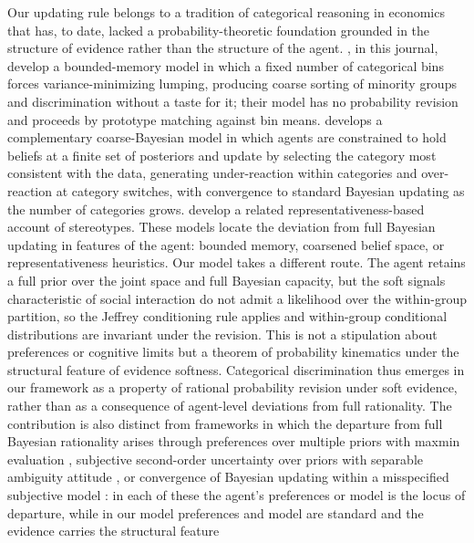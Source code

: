 \documentclass[12pt,a4paper]{article}
\theoremstyle{definition}
\numberwithin{proposition}{subsection}
\begin{document}
Our updating rule belongs to a tradition of categorical reasoning in
economics that has, to date, lacked a probability-theoretic foundation
grounded in the structure of evidence rather than the structure of the
agent. \citet{FryerJackson2008}, in this journal, develop a
bounded-memory model in which a fixed number of categorical bins forces
variance-minimizing lumping, producing coarse sorting of minority
groups and discrimination without a taste for it; their model has no
probability revision and proceeds by prototype matching against bin
means. \citet{Mullainathan2002} develops a complementary
coarse-Bayesian model in which agents are constrained to hold beliefs
at a finite set of posteriors and update by selecting the category
most consistent with the data, generating under-reaction within
categories and over-reaction at category switches, with convergence to
standard Bayesian updating as the number of categories grows.
\citet{BordaloEtal2016} develop a related representativeness-based
account of stereotypes. These models locate the deviation from full
Bayesian updating in features of the agent: bounded memory, coarsened
belief space, or representativeness heuristics. Our model takes a
different route. The agent retains a full prior over the joint space
and full Bayesian capacity, but the soft signals characteristic of
social interaction do not admit a likelihood over the within-group
partition, so the Jeffrey conditioning rule applies and within-group
conditional distributions are invariant under the revision. This is
not a stipulation about preferences or cognitive limits but a theorem
of probability kinematics \citep{Jeffrey1965,Jeffrey2004} under the
structural feature of evidence softness. Categorical discrimination
thus emerges in our framework as a property of rational probability
revision under soft evidence, rather than as a consequence of
agent-level deviations from full rationality. The contribution is
also distinct from frameworks in which the departure from full
Bayesian rationality arises through preferences over multiple priors
with maxmin evaluation \citep{GilboaSchmeidler1989}, subjective
second-order uncertainty over priors with separable ambiguity attitude
\citep{KlibanoffMarinacciMukerji2005}, or convergence of Bayesian
updating within a misspecified subjective model
\citep{EspondaPouzo2016}: in each of these the agent's preferences or
model is the locus of departure, while in our model preferences and
model are standard and the evidence carries the structural feature
\end{document}
